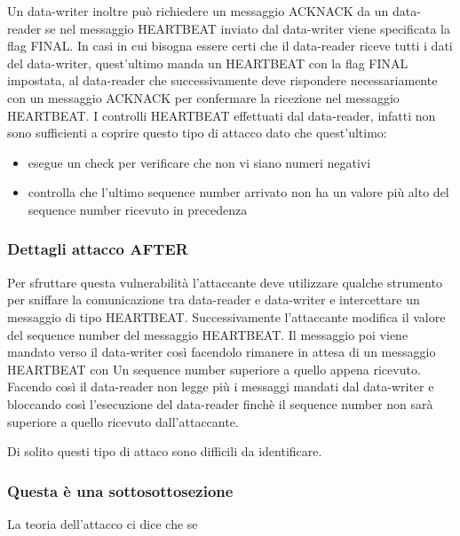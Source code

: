 Un data-writer inoltre può richiedere un messaggio ACKNACK da un data-reader se 
nel messaggio HEARTBEAT inviato dal data-writer viene specificata la flag FINAL.
In casi in cui bisogna essere certi che il data-reader riceve tutti i dati del
data-writer, quest'ultimo manda un HEARTBEAT con la flag FINAL impostata, al
data-reader che successivamente deve rispondere necessariamente con un messaggio
ACKNACK per confermare la ricezione nel messaggio HEARTBEAT.
I controlli HEARTBEAT effettuati dal data-reader,
infatti non sono sufficienti a coprire questo tipo di attacco
dato che quest'ultimo:
\begin{itemize}
    \item esegue un check per verificare che non vi siano numeri negativi
    \item controlla che l'ultimo sequence number arrivato non ha un valore più alto 
    del sequence number ricevuto in precedenza 
\end{itemize}
\subsubsection{Dettagli attacco AFTER}
Per sfruttare questa vulnerabilità l'attaccante deve utilizzare qualche strumento
per sniffare la comunicazione tra data-reader e data-writer e intercettare un
messaggio di tipo HEARTBEAT. Successivamente l'attaccante modifica il valore del
sequence number del messaggio HEARTBEAT. Il messaggio poi viene mandato verso il
data-writer così facendolo rimanere in attesa di un messaggio HEARTBEAT con Un
sequence number superiore a quello appena ricevuto. Facendo così il data-reader
non legge più i messaggi mandati dal data-writer e bloccando così l'esecuzione
del data-reader finchè il sequence number non 
sarà superiore a quello ricevuto dall'attaccante.

Di solito questi tipo di attaco sono difficili da identificare.


\subsubsection{Questa è una sottosottosezione}
La teoria dell'attacco ci dice che se 


\setlength{\arrayrulewidth}{1.0pt} %


